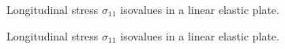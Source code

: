 
\begin{figure}[h!]
  \centering
  
  \caption{Longitudinal stress $\sigma_{11}$ isovalues in a linear elastic plate.}
  \label{fig:2dhe_stress}
\end{figure}


\begin{figure}[h!]
  \centering
  
  \caption{Longitudinal stress $\sigma_{11}$ isovalues in a linear elastic plate.}
  \label{fig:2dhe_velo}
\end{figure}

